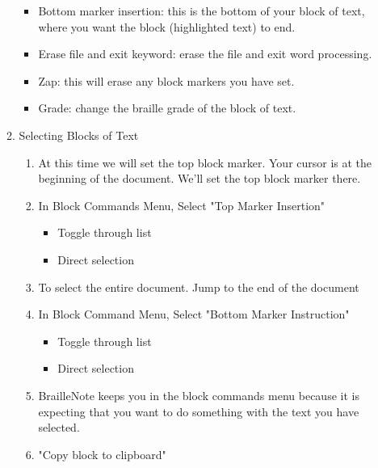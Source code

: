 \documentclass[10pt,letterpaper,twoside]{report}
\begin{document}
\begin{enumerate}
\begin{enumerate}
\begin{itemize}
			            \item Bottom marker insertion: this is the bottom of your block of text, where you want the block (highlighted text) to end.
			            \item Erase file and exit keyword: erase the file and exit word processing.
			            \item Zap: this will erase any block markers you have set.
			            \item Grade: change the braille grade of the block of text.
		            \end{itemize}
		      \item Selecting Blocks of Text
		            \begin{enumerate}
			            \item At this time we will set the top block marker. Your cursor is at the beginning of the document. We'll set the top block marker there.
			            \item In Block Commands Menu, Select "Top Marker Insertion"
			                  \begin{itemize}
				                  \item Toggle through list 
				                  \item Direct selection 
			                  \end{itemize}
			            \item To select the entire document. Jump to the end of the document 
			            \item In Block Command Menu, Select "Bottom Marker Instruction"
			                  \begin{itemize}
				                  \item Toggle through list 
				                  \item Direct selection 
			                  \end{itemize}
			            \item BrailleNote keeps you in the block commands menu because it is expecting that you want to do something with the text you have selected.
			            \item "Copy block to clipboard"
			                  \begin{itemize}

\end{itemize}
\end{enumerate}
\end{enumerate}
\end{enumerate}
\end{document}
